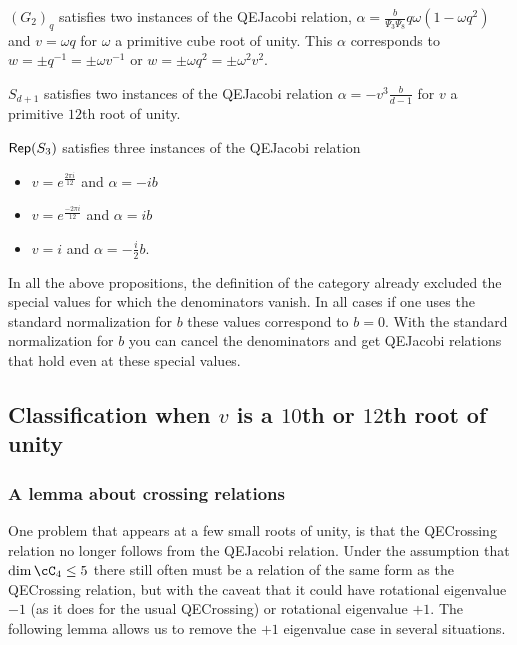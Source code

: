 \documentclass[12pt]{amsart}
\begin{document}
\begin{lemma}
$(G_2)_q$ satisfies two instances of the QEJacobi relation, $\alpha = \frac{b}{\Psi_3 \Psi_8} q \omega (1-\omega q^2)$ and $v = \omega q$ for $\omega$ a primitive cube root of unity.  This $\alpha$ corresponds to $w = \pm q^{-1} = \pm \omega v^{-1}$ or $w = \pm \omega q^2 = \pm \omega^2 v^2$.
\end{lemma}

\begin{lemma}
$S_{d+1}$ satisfies two instances of the QEJacobi relation $\alpha = -v^3 \frac{b}{d-1}$ for $v$ a primitive $12$th root of unity.
\end{lemma}

\begin{lemma}
$\operatorname{\mathsf{Rep}}(S_3)$ satisfies three instances of the QEJacobi relation
\begin{itemize}
\item $v = e^{\frac{2 \pi i}{12}}$ and $\alpha = -i b$
\item $v = e^{\frac{-2 \pi i}{12}}$ and $\alpha = i b$
\item $v = i$ and $\alpha = -\frac{i}{2} b$.
\end{itemize}
\end{lemma}

\begin{remark}
In all the above propositions, the definition of the category already excluded the special values for which the denominators vanish.  In all cases if one uses the standard normalization for $b$ these values correspond to $b=0$.  With the standard normalization for $b$ you can cancel the denominators and get QEJacobi relations that hold even at these special values.
\end{remark}



\subsection{Classification when $v$ is a $10$th or $12$th root of unity}


\subsubsection{A lemma about crossing relations}

One problem that appears at a few small roots of unity, is that the QECrossing relation no longer follows from the QEJacobi relation.  Under the assumption that $\dim \cC_4 \leq 5$ there still often must be a relation of the same form as the QECrossing relation, but with the caveat that it could have rotational eigenvalue $-1$ (as it does for the usual QECrossing) or rotational eigenvalue $+1$.  The following lemma allows us to remove the $+1$ eigenvalue case in several situations.
\end{document}
